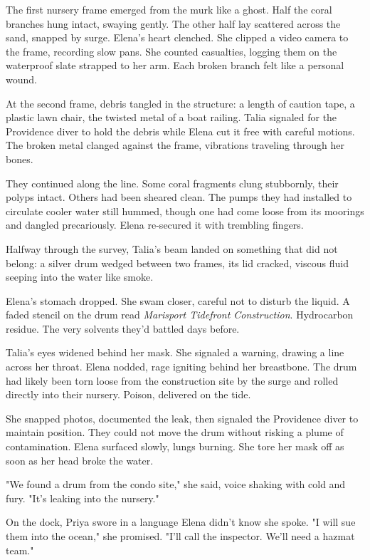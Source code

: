The first nursery frame emerged from the murk like a ghost. Half the coral branches hung intact, swaying gently. The other half lay scattered across the sand, snapped by surge. Elena's heart clenched. She clipped a video camera to the frame, recording slow pans. She counted casualties, logging them on the waterproof slate strapped to her arm. Each broken branch felt like a personal wound.

At the second frame, debris tangled in the structure: a length of caution tape, a plastic lawn chair, the twisted metal of a boat railing. Talia signaled for the Providence diver to hold the debris while Elena cut it free with careful motions. The broken metal clanged against the frame, vibrations traveling through her bones.

They continued along the line. Some coral fragments clung stubbornly, their polyps intact. Others had been sheared clean. The pumps they had installed to circulate cooler water still hummed, though one had come loose from its moorings and dangled precariously. Elena re-secured it with trembling fingers.

Halfway through the survey, Talia's beam landed on something that did not belong: a silver drum wedged between two frames, its lid cracked, viscous fluid seeping into the water like smoke.

Elena's stomach dropped. She swam closer, careful not to disturb the liquid. A faded stencil on the drum read \textit{Marisport Tidefront Construction}. Hydrocarbon residue. The very solvents they'd battled days before.

Talia's eyes widened behind her mask. She signaled a warning, drawing a line across her throat. Elena nodded, rage igniting behind her breastbone. The drum had likely been torn loose from the construction site by the surge and rolled directly into their nursery. Poison, delivered on the tide.

She snapped photos, documented the leak, then signaled the Providence diver to maintain position. They could not move the drum without risking a plume of contamination. Elena surfaced slowly, lungs burning. She tore her mask off as soon as her head broke the water.

"We found a drum from the condo site," she said, voice shaking with cold and fury. "It's leaking into the nursery."

On the dock, Priya swore in a language Elena didn't know she spoke. "I will sue them into the ocean," she promised. "I'll call the inspector. We'll need a hazmat team."

